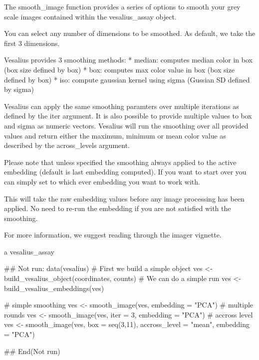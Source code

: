 \documentclass[a4paper]{book}
\begin{document}
%
\begin{Details}
The smooth\_image function provides a series of options to smooth
your grey scale images contained within the vesalius\_assay object.

You can select any number of dimensions to be smoothed. As default, we take
the first 3 dimensions.

Vesalius provides 3 smoothing methods:
* median: computes median color in box (box size defined by box)
* box: computes max color value in box (box size defined by box)
* iso: compute gaussian kernel using sigma (Gussian SD defined by sigma)

Vesalius can apply the same smoothing paramters over multiple iterations
as defined by the iter argument.
It is also possible to provide multiple values to box and sigma as numeric
vectors. Vesalius will run the smoothing over all provided values and return
either the maximum, minimum or mean color value as described by the
across\_levels argument.

Please note that unless specified the smoothing always applied to
the active embedding (default is last embedding computed). If you
want to start over you can simply set  to which ever
embedding you want to work with.

This will take the raw embedding values before any image processing
has been applied. No need to re-run the embedding if you are not
satisfied with the smoothing.

For more information, we suggest reading through the imager vignette.
\end{Details}
%
\begin{Value}
a vesalius\_assay
\end{Value}
%
\begin{Examples}
\begin{ExampleCode}
## Not run: 
data(vesalius)
# First we build a simple object
ves <- build_vesalius_object(coordinates, counts)
# We can do a simple run
ves <- build_vesalius_embeddings(ves)

# simple smoothing
ves <- smooth_image(ves, embedding = "PCA")
# multiple rounds
ves <- smooth_image(ves, iter = 3, embedding = "PCA")
# accross level
ves <- smooth_image(ves, box = seq(3,11),
 accross_level = "mean",
 embedding = "PCA")

## End(Not run)
\end{ExampleCode}
\end{Examples}
\end{document}
